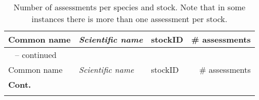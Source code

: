 \begin{center}\begin{footnotesize}
\begin{longtable}{l | l | l | r}

\caption{Number of assessments per species and stock. Note that in some instances there is more than one assessment per stock.}

\\ \hline
Common name & \textit{Scientific name} & stockID & \# assessments \\
\hline \hline
\endfirsthead

\tablename\ \thetable{} -- continued \\ \hline
Common name & \textit{Scientific name} & stockID & \# assessments \\
\hline \hline
\endhead

\hline {{\bfseries Cont.} } \\ \hline
\endfoot

\hline \hline
\endlastfoot


\end{longtable}
\end{footnotesize}
\end{center}
